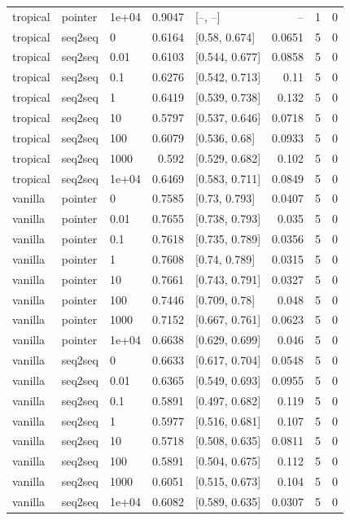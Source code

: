 \documentclass[10pt]{article}
\begin{document}
{\begin{longtable}{lllrlrrr}
tropical & pointer & 1e+04 & 0.9047 & [--, --] & -- & 1 & 0\\
tropical & seq2seq & 0 & 0.6164 & [0.58, 0.674] & 0.0651 & 5 & 0\\
tropical & seq2seq & 0.01 & 0.6103 & [0.544, 0.677] & 0.0858 & 5 & 0\\
tropical & seq2seq & 0.1 & 0.6276 & [0.542, 0.713] & 0.11 & 5 & 0\\
tropical & seq2seq & 1 & 0.6419 & [0.539, 0.738] & 0.132 & 5 & 0\\
tropical & seq2seq & 10 & 0.5797 & [0.537, 0.646] & 0.0718 & 5 & 0\\
tropical & seq2seq & 100 & 0.6079 & [0.536, 0.68] & 0.0933 & 5 & 0\\
tropical & seq2seq & 1000 & 0.592 & [0.529, 0.682] & 0.102 & 5 & 0\\
tropical & seq2seq & 1e+04 & 0.6469 & [0.583, 0.711] & 0.0849 & 5 & 0\\
vanilla & pointer & 0 & 0.7585 & [0.73, 0.793] & 0.0407 & 5 & 0\\
vanilla & pointer & 0.01 & 0.7655 & [0.738, 0.793] & 0.035 & 5 & 0\\
vanilla & pointer & 0.1 & 0.7618 & [0.735, 0.789] & 0.0356 & 5 & 0\\
vanilla & pointer & 1 & 0.7608 & [0.74, 0.789] & 0.0315 & 5 & 0\\
vanilla & pointer & 10 & 0.7661 & [0.743, 0.791] & 0.0327 & 5 & 0\\
vanilla & pointer & 100 & 0.7446 & [0.709, 0.78] & 0.048 & 5 & 0\\
vanilla & pointer & 1000 & 0.7152 & [0.667, 0.761] & 0.0623 & 5 & 0\\
vanilla & pointer & 1e+04 & 0.6638 & [0.629, 0.699] & 0.046 & 5 & 0\\
vanilla & seq2seq & 0 & 0.6633 & [0.617, 0.704] & 0.0548 & 5 & 0\\
vanilla & seq2seq & 0.01 & 0.6365 & [0.549, 0.693] & 0.0955 & 5 & 0\\
vanilla & seq2seq & 0.1 & 0.5891 & [0.497, 0.682] & 0.119 & 5 & 0\\
vanilla & seq2seq & 1 & 0.5977 & [0.516, 0.681] & 0.107 & 5 & 0\\
vanilla & seq2seq & 10 & 0.5718 & [0.508, 0.635] & 0.0811 & 5 & 0\\
vanilla & seq2seq & 100 & 0.5891 & [0.504, 0.675] & 0.112 & 5 & 0\\
vanilla & seq2seq & 1000 & 0.6051 & [0.515, 0.673] & 0.104 & 5 & 0\\
vanilla & seq2seq & 1e+04 & 0.6082 & [0.589, 0.635] & 0.0307 & 5 & 0\\
\bottomrule
\end{longtable}
}
\end{document}
